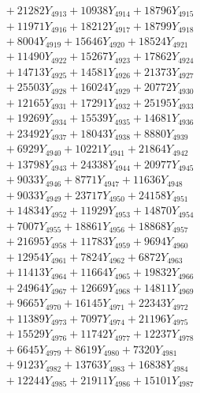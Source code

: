 \documentclass[a4paper,10pt]{article}
\begin{document}
{\begin{align}
&\;  + 21282 Y_{4913} + 10938 Y_{4914} + 18796 Y_{4915} \\[0.3ex]
&\;  + 11971 Y_{4916} + 18212 Y_{4917} + 18799 Y_{4918} \\[0.5ex]\allowbreak
&\;  + 8004 Y_{4919} + 15646 Y_{4920} + 18524 Y_{4921} \\[0.3ex]
&\;  + 11490 Y_{4922} + 15267 Y_{4923} + 17862 Y_{4924} \\[0.3ex]
&\;  + 14713 Y_{4925} + 14581 Y_{4926} + 21373 Y_{4927} \\[0.3ex]
&\;  + 25503 Y_{4928} + 16024 Y_{4929} + 20772 Y_{4930} \\[0.3ex]
&\;  + 12165 Y_{4931} + 17291 Y_{4932} + 25195 Y_{4933} \\[0.3ex]
&\;  + 19269 Y_{4934} + 15539 Y_{4935} + 14681 Y_{4936} \\[0.3ex]
&\;  + 23492 Y_{4937} + 18043 Y_{4938} + 8880 Y_{4939} \\[0.3ex]
&\;  + 6929 Y_{4940} + 10221 Y_{4941} + 21864 Y_{4942} \\[0.3ex]
&\;  + 13798 Y_{4943} + 24338 Y_{4944} + 20977 Y_{4945} \\[0.3ex]
&\;  + 9033 Y_{4946} + 8771 Y_{4947} + 11636 Y_{4948} \\[0.5ex]\allowbreak
&\;  + 9033 Y_{4949} + 23717 Y_{4950} + 24158 Y_{4951} \\[0.3ex]
&\;  + 14834 Y_{4952} + 11929 Y_{4953} + 14870 Y_{4954} \\[0.3ex]
&\;  + 7007 Y_{4955} + 18861 Y_{4956} + 18868 Y_{4957} \\[0.3ex]
&\;  + 21695 Y_{4958} + 11783 Y_{4959} + 9694 Y_{4960} \\[0.3ex]
&\;  + 12954 Y_{4961} + 7824 Y_{4962} + 6872 Y_{4963} \\[0.3ex]
&\;  + 11413 Y_{4964} + 11664 Y_{4965} + 19832 Y_{4966} \\[0.3ex]
&\;  + 24964 Y_{4967} + 12669 Y_{4968} + 14811 Y_{4969} \\[0.3ex]
&\;  + 9665 Y_{4970} + 16145 Y_{4971} + 22343 Y_{4972} \\[0.3ex]
&\;  + 11389 Y_{4973} + 7097 Y_{4974} + 21196 Y_{4975} \\[0.3ex]
&\;  + 15529 Y_{4976} + 11742 Y_{4977} + 12237 Y_{4978} \\[0.5ex]\allowbreak
&\;  + 6645 Y_{4979} + 8619 Y_{4980} + 7320 Y_{4981} \\[0.3ex]
&\;  + 9123 Y_{4982} + 13763 Y_{4983} + 16838 Y_{4984} \\[0.3ex]
&\;  + 12244 Y_{4985} + 21911 Y_{4986} + 15101 Y_{4987} \\[0.3ex]

\end{align}}
\end{document}
